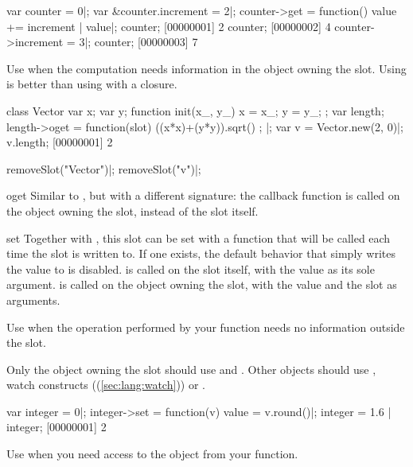 \begin{urbiscriptapi}
\begin{urbiscript}
var counter = 0|;
var &counter.increment = 2|;
counter->get = function()
{ value += increment | value}|;
counter;
[00000001] 2
counter;
[00000002] 4
counter->increment = 3|;
counter;
[00000003] 7
\end{urbiscript}

Use  when the computation needs information in the object
owning the slot. Using  is better than using  with
a closure.

\begin{urbiscript}
class Vector
{
  var x;
  var y;
  function init(x_, y_)
  {
    x = x_;
    y = y_;
  };
  var length;
  length->oget = function(slot)
  {
    ((x*x)+(y*y)).sqrt()
  };
}|;
var v = Vector.new(2, 0)|;
v.length;
[00000001] 2
\end{urbiscript}

\begin{urbicomment}
removeSlot("Vector")|;
removeSlot("v")|;
\end{urbicomment}

\item[oget]%
  Similar to , but with a different signature: the callback
  function is called on the object owning the slot, instead of the slot
  itself.

\item[set]%
  Together with , this slot can be set with a function that will
  be called each time the
  slot is written to. If one exists, the default behavior that simply writes
  the value to  is disabled.
   is called on the slot itself, with the value as its sole
  argument.  is called on the object owning the slot, with
  the value and the slot as arguments.

  Use  when the operation performed by your function needs no
  information outside the slot.

  Only the object owning the slot should use  and .
  Other objects should use , watch constructs
  ((\autoref{sec:lang:watch})) or .

\begin{urbiscript}
var integer = 0|;
integer->set = function(v) { value = v.round()}|;
integer = 1.6 | integer;
[00000001] 2
\end{urbiscript}

  Use  when you need access to the object from your function.


\end{urbiscriptapi}
